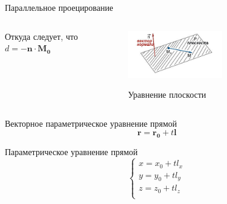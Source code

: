 \documentclass{beamer}
\begin{document}
\begin{frame}{Параллельное проецирование}
{\begin{columns}
\begin{column}{0.5\textwidth}
							Откуда следует, что
							$
								d = - \bm{n} \cdot \bm{M_0}
							$
			\end{column}
			\begin{column}{0.5\textwidth}
				\begin{figure} 
					\href{https://function-x.ru/image/plane_pic01.jpg}{
						\includegraphics[width=0.6\textwidth]{images/plane.jpg}}
					\caption{Уравнение плоскости}
				\end{figure}
			\end{column}
		\end{columns}

			Векторное параметрическое уравнение прямой
			\[
				\bm{r}=\bm{r_0}+t\bm{l}	
			\]
			
			Параметрическое уравнение прямой
			\[
				\begin{cases} x=x_0+tl_x \\
					y=y_0+tl_y \\
					z=z_0+tl_z \\
					\end{cases}
			\]
			}

	\end{frame}
\end{document}
